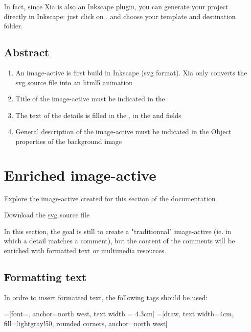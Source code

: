 In fact, since Xia is also an Inkscape plugin, you can generate your project directly 
in Inkscape: just click on , 
and choose your template and destination folder.

\subsection{Abstract}

\begin{enumerate}
 \item An image-active is first build in Inkscape (svg format). Xia only 
 converts the svg source file into an html5 animation
 \item Title of the image-active must be indicated in the 
 \item The text of the details is filled in the , 
 in the  and  fields
 \item General description of the image-active must be indicated in the \chemin
{Object properties} of the background image
\end{enumerate}

\section{Enriched image-active}\label{enriched_IA}

\begin{links}
Explore the \href{http://images-actives.crdp-versailles.fr/beta/demo/tuto/xia2}{image-active created for this section of the documentation} 

Download the \href{http://images-actives.crdp-versailles.fr/beta/demo/tuto/xia2/svg/xia2.svg}{svg} source file
\end{links}

In this section, the goal is still to create a "traditionnal" image-active 
(ie. in which a detail matches a comment), but the content of the comments 
will be enriched with  formatted text or multimedia resources.

\subsection{Formatting text}

In ordre to insert formatted text, the following tags should be used:

=[font=\sffamily, anchor=north west, text width = 4.3cm]
=[draw, text width=4cm, fill=lightgray!50, rounded corners, anchor=north west]

